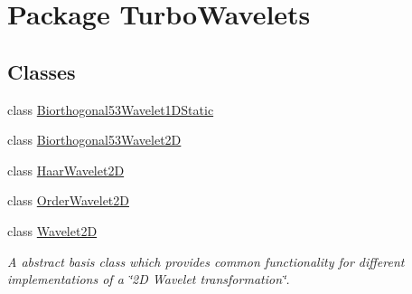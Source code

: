 \hypertarget{namespace_turbo_wavelets}{\section{\-Package \-Turbo\-Wavelets}
\label{namespace_turbo_wavelets}
}
\subsection*{\-Classes}
\begin{DoxyCompactItemize}
\item 
class \hyperlink{class_turbo_wavelets_1_1_biorthogonal53_wavelet1_d_static}{\-Biorthogonal53\-Wavelet1\-D\-Static}
\item 
class \hyperlink{class_turbo_wavelets_1_1_biorthogonal53_wavelet2_d}{\-Biorthogonal53\-Wavelet2\-D}
\item 
class \hyperlink{class_turbo_wavelets_1_1_haar_wavelet2_d}{\-Haar\-Wavelet2\-D}
\item 
class \hyperlink{class_turbo_wavelets_1_1_order_wavelet2_d}{\-Order\-Wavelet2\-D}
\item 
class \hyperlink{class_turbo_wavelets_1_1_wavelet2_d}{\-Wavelet2\-D}
\begin{DoxyCompactList}\small\item\em \-A abstract basis class which provides common functionality for different implementations of a \char`\"{}2\-D Wavelet transformation\char`\"{}. \end{DoxyCompactList}\end{DoxyCompactItemize}
